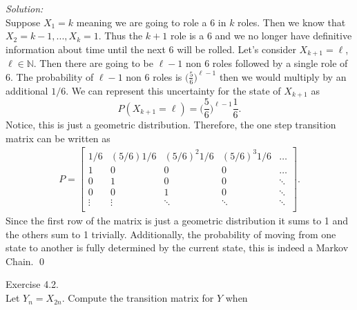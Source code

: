 \documentclass[10pt]{amsart}
\begin{document}
\begin{enumerate}[(a)]
\noindent
\textit{Solution:} \\
Suppose $X_1 = k$ meaning we are going to role a 6 in $k$ roles.
Then we know that $X_2 = k - 1, ..., X_k = 1$.
Thus the $k + 1$ role is a 6 and we no longer have definitive information about time until the next 6 will be rolled.
Let's consider $X_{k + 1} = \ell$, $\ell \in \mathbb N$. Then there are going to be $\ell - 1$ non 6 roles followed by a single role of 6.
The probability of $\ell - 1$ non 6 roles is $\big(\frac 5 6 \big)^{\ell - 1}$ then we would multiply by an additional $1/6$.
We can represent this uncertainty for the state of $X_{k+1}$ as 
$$P(X_{k + 1} = \ell) = \bigg(\frac 5 6 \bigg)^{\ell - 1}\frac 1 6.$$
Notice, this is just a geometric distribution.
Therefore, the one step transition matrix can be written as
\begin{align*}
P =
\begin{bmatrix}
1/6 & (5/6)1/6 & (5/6)^2 1/6 & (5/6)^3 1/6 & \dots \\
1 & 0 & 0 & 0 & \dots \\
0 & 1 & 0 & 0 & \ddots\\
0 & 0 & 1 & 0 & \ddots\\
\vdots & \vdots & \ddots & \ddots & \ddots\\
\end{bmatrix}.
\end{align*}
Since the first row of the matrix is just a geometric distribution it sums to 1 and the others sum to 1 trivially.
Additionally, the probability of moving from one state to another is fully determined by the current state, this is indeed a Markov Chain.
\qed \\

\end{enumerate}
\newpage


 Exercise 4.2. \\
Let $Y_n = X_{2n}$. Compute the transition matrix for $Y$ when
\end{document}
